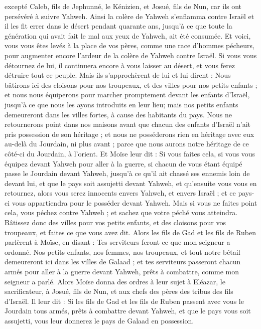 \begin{multicols}{2}
excepté Caleb, fils de Jephunné, le Kénizien, et Josué, fils de Nun,  car ils ont persévéré à suivre Yahweh.
Ainsi la colère de Yahweh s'enflamma contre Israël et il les fit errer dans le désert pendant quarante ans, jusqu'à ce que toute la génération qui avait fait le mal aux yeux de Yahweh, ait été consumée.
Et voici, vous vous êtes levés à la place de vos pères, comme une race d'hommes pécheurs, pour augmenter encore l'ardeur de la colère de Yahweh contre Israël.
Si vous vous détournez de lui, il continuera encore à vous laisser au désert, et vous ferez détruire tout ce peuple.
Mais ils s'approchèrent de lui et lui dirent : Nous bâtirons ici des cloisons pour nos troupeaux, et des villes pour nos petits enfants ;
et nous nous équiperons pour marcher promptement devant les enfants d'Israël, jusqu'à ce que nous les ayons introduits en leur lieu; mais nos petits enfants demeureront dans les villes fortes, à cause des habitants du pays.
Nous ne retournerons point dans nos maisons avant que chacun des enfants d'Israël n'ait pris possession de son héritage ;
et nous ne posséderons rien en héritage avec eux au-delà du Jourdain, ni plus avant ; parce que nous aurons notre héritage de ce côté-ci du Jourdain, à l'orient.
Et Moïse leur dit : Si vous faites cela, si vous vous équipez devant Yahweh pour aller à la guerre,
si chacun de vous étant équipé passe le Jourdain devant Yahweh, jusqu'à ce qu'il ait chassé ses ennemis loin de devant lui,
et que le pays soit assujetti devant Yahweh, et qu’ensuite vous vous en retournez, alors vous serez innocents envers Yahweh, et envers Israël ; et ce pays-ci vous appartiendra pour le posséder devant Yahweh.
Mais si vous ne faites point cela, vous péchez contre Yahweh ; et sachez que votre péché vous atteindra.
Bâtissez donc des villes pour vos petits enfants, et des cloisons pour vos troupeaux, et faites ce que vous avez dit.
Alors les fils de Gad et les fils de Ruben parlèrent à Moïse, en disant : Tes serviteurs feront ce que mon seigneur a ordonné.
Nos petits enfants, nos femmes, nos troupeaux, et tout notre bétail demeureront ici dans les villes de Galaad ;
et tes serviteurs passeront chacun armés pour aller à la guerre devant Yahweh, prêts à combattre, comme mon seigneur a parlé.
Alors Moïse donna des ordres à leur sujet à Eléazar, le sacrificateur, à Josué, fils de Nun, et aux chefs des pères des tribus des fils d'Israël.
Il leur dit : Si les fils de Gad et les fils de Ruben passent avec vous le Jourdain tous armés, prêts à combattre devant Yahweh, et que le pays vous soit assujetti, vous leur donnerez le pays de Galaad en possession.

\end{multicols}
